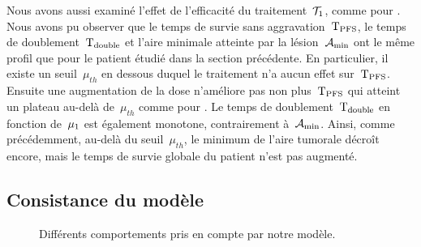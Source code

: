 \documentclass[main.tex]{subfiles}
\begin{document}
Nous avons aussi examiné l'effet de l'efficacité du traitement~$\mathcal{T}_1$, comme pour \Nber. 
Nous avons pu observer que le temps de survie sans aggravation~${\rm T_{PFS}}$, le temps de doublement~${\rm T_{double}}$ et l'aire minimale atteinte par la  lésion~$\mathcal{A}_{\rm min}$ ont le même profil que pour le patient étudié dans la section précédente. En particulier, il existe un seuil~$\mu_{th}$ en dessous duquel le  traitement n'a aucun effet sur~${\rm T_{PFS}}$. Ensuite une augmentation de la dose n'améliore pas non plus~${\rm T_{PFS}}$ qui atteint un plateau au-delà de~$\mu_{th}$ comme pour \Nber. 
Le temps de doublement~${\rm T_{double}}$ en fonction de~$\mu_1$ est également monotone, contrairement à~$\mathcal{A}_{\rm min}$. Ainsi, comme précédemment, au-delà du seuil~$\mu_{th}$, le minimum de l'aire tumorale décroît encore, mais le temps de survie globale du patient n'est pas augmenté.



\subsection{Consistance du modèle\label{section_possibilites}}
\begin{figure}[h]
\vspace{-1cm}
\centering \hfill
\captionsetup[subfigure]{margin=10pt}
\renewcommand{\thesubfigure}{b-c-d}
\renewcommand{\thesubfigure}{e-f-g}
\caption{\label{fig:possibilites}Différents comportements pris en compte par notre modèle.}
\vspace{-1cm}
\end{figure}
\end{document}
